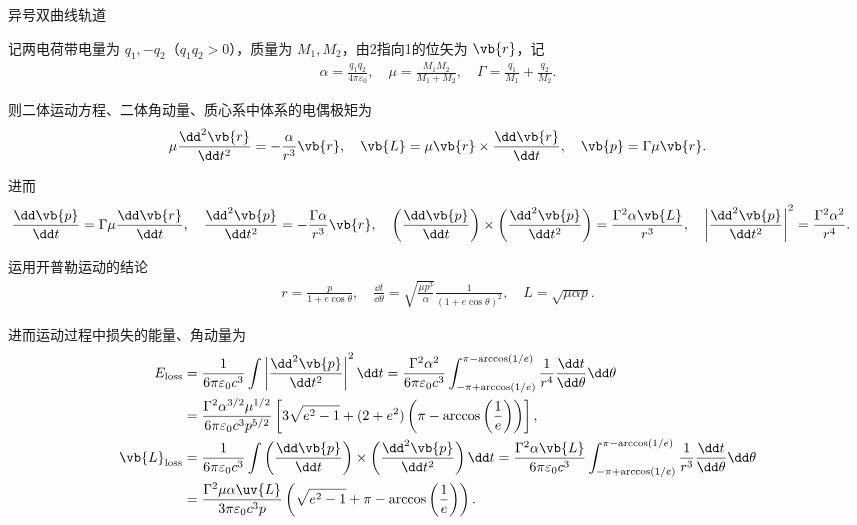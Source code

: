 \begin{exbox}
	异号双曲线轨道

	记两电荷带电量为 \(q_1, -q_2\)（\(q_1 q_2 > 0\)），质量为 \(M_1, M_2\)，由2指向1的位矢为 \(\vb{r}\)，记
	\begin{align*}
		\alpha = \frac{q_1 q_2}{4\pi\varepsilon_0}, \quad \mu = \frac{M_1 M_2}{M_1 + M_2}, \quad \Gamma = \frac{q_1}{M_1} + \frac{q_2}{M_2}.
	\end{align*}

	则二体运动方程、二体角动量、质心系中体系的电偶极矩为
	\begin{align*}
		\mu \frac{\dd^2\vb{r}}{\dd t^2} = -\frac{\alpha}{r^3}\vb{r}, \quad \vb{L} = \mu \vb{r} \times \frac{\dd \vb{r}}{\dd t}, \quad \vb{p} = \Gamma \mu \vb{r}.
	\end{align*}

	进而
	\begin{align*}
		\frac{\dd \vb{p}}{\dd t} &= \Gamma \mu \frac{\dd \vb{r}}{\dd t}, \quad \frac{\dd^2\vb{p}}{\dd t^2} = -\frac{\Gamma \alpha}{r^3}\vb{r}, \quad
		\left( \frac{\dd \vb{p}}{\dd t} \right) \times \left( \frac{\dd^2\vb{p}}{\dd t^2} \right) = \frac{\Gamma^2 \alpha \vb{L}}{r^3}, \quad \left| \frac{\dd^2\vb{p}}{\dd t^2} \right|^2 = \frac{\Gamma^2 \alpha^2}{r^4}.
	\end{align*}

	运用开普勒运动的结论
	\begin{align*}
		r = \frac{p}{1 + e\cos\theta}, \quad \frac{\dd t}{\dd \theta} = \sqrt{\frac{\mu p^3}{\alpha}} \frac{1}{(1 + e\cos\theta)^2}, \quad L = \sqrt{\mu\alpha p}.
	\end{align*}

	进而运动过程中损失的能量、角动量为
	\begin{align*}
		E_{\text{loss}} &= \frac{1}{6\pi\varepsilon_0 c^3} \int \left| \frac{\dd^2\vb{p}}{\dd t^2} \right|^2 \dd t = \frac{\Gamma^2 \alpha^2}{6\pi\varepsilon_0 c^3} \int_{-\pi + \arccos(1/e)}^{\pi - \arccos(1/e)} \frac{1}{r^4} \frac{\dd t}{\dd \theta} \dd \theta \\
		&= \frac{\Gamma^2 \alpha^{3/2} \mu^{1/2}}{6\pi\varepsilon_0 c^3 p^{5/2}} \left[ 3\sqrt{e^2 - 1} + (2 + e^2)\left( \pi - \arccos\left( \frac{1}{e} \right) \right) \right], \\
		\vb{L}_{\text{loss}} &= \frac{1}{6\pi\varepsilon_0 c^3} \int\left( \frac{\dd \vb{p}}{\dd t} \right) \times \left( \frac{\dd^2\vb{p}}{\dd t^2} \right) \dd t= \frac{\Gamma^2 \alpha \vb{L}}{6\pi\varepsilon_0 c^3} \int_{-\pi + \arccos(1/e)}^{\pi - \arccos(1/e)} \frac{1}{r^3} \frac{\dd t}{\dd \theta} \dd \theta \\
		&= \frac{\Gamma^2 \mu \alpha \uv{L}}{3\pi\varepsilon_0 c^3 p} \left( \sqrt{e^2 - 1} + \pi - \arccos\left( \frac{1}{e} \right) \right).
	\end{align*}
\end{exbox}

